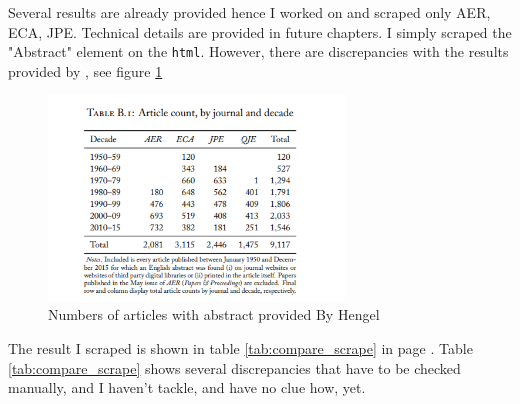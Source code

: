 Several results are already provided hence I worked on and scraped only AER, ECA, JPE. Technical details are provided in future chapters. I simply scraped the "Abstract" element on the \verb|html|. However, there are discrepancies with the results provided by \cite{Hengel17}, see figure \ref{fig:HengelNum}

\begin{figure}[h]
    \centering
    \includegraphics[width = 0.7\textwidth]{IMG/article count.png}
    \caption{Numbers of articles with abstract provided By Hengel}
    \label{fig:HengelNum}
\end{figure}

The result I scraped is shown in table \ref{tab:compare_scrape} in page \pageref{tab:compare_scrape}. Table \ref{tab:compare_scrape} shows several discrepancies that have to be checked manually, and I haven't tackle, and have no clue how, yet. 

